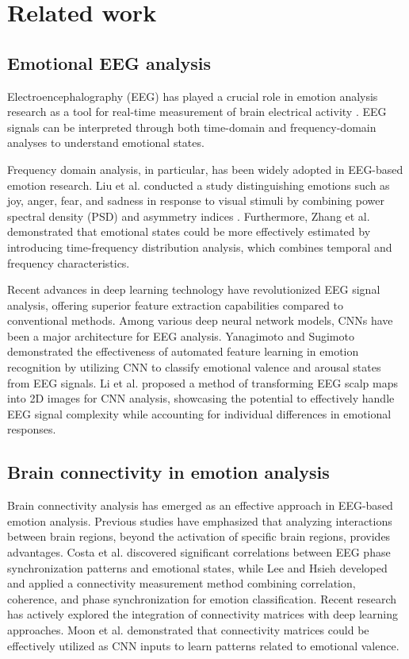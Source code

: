 \section{Related work}
\subsection{Emotional EEG analysis}

Electroencephalography (EEG) has played a crucial role in emotion analysis research as a tool for real-time measurement of brain electrical activity \cite{moon2016implicit}. EEG signals can be interpreted through both time-domain and frequency-domain analyses to understand emotional states.

Frequency domain analysis, in particular, has been widely adopted in EEG-based emotion research. Liu et al. \cite{liu2017real} conducted a study distinguishing emotions such as joy, anger, fear, and sadness in response to visual stimuli by combining power spectral density (PSD) and asymmetry indices . Furthermore, Zhang et al. \cite{zhang2016approach} demonstrated that emotional states could be more effectively estimated by introducing time-frequency distribution analysis, which combines temporal and frequency characteristics.

Recent advances in deep learning technology have revolutionized EEG signal analysis, offering superior feature extraction capabilities compared to conventional methods. Among various deep neural network models, CNNs have been a major architecture for EEG analysis. Yanagimoto and Sugimoto \cite{yanagimoto2016convolutional} demonstrated the effectiveness of automated feature learning in emotion recognition by utilizing CNN to classify emotional valence and arousal states from EEG signals. 
Li et al. \cite{li2018hierarchical} proposed a method of transforming EEG scalp maps into 2D images for CNN analysis, showcasing the potential to effectively handle EEG signal complexity while accounting for individual differences in emotional responses.


\subsection{Brain connectivity in emotion analysis}
Brain connectivity analysis has emerged as an effective approach in EEG-based emotion analysis. Previous studies have emphasized that analyzing interactions between brain regions, beyond the activation of specific brain regions, provides advantages. Costa et al. \cite{costa2006eeg} discovered significant correlations between EEG phase synchronization patterns and emotional states, while Lee and Hsieh \cite{lee2014classifying} developed and applied a connectivity measurement method combining correlation, coherence, and phase synchronization for emotion classification.
Recent research has actively explored the integration of connectivity matrices with deep learning approaches. Moon et al. \cite{moon2020emotional} demonstrated that connectivity matrices could be effectively utilized as CNN inputs to learn patterns related to emotional valence.

